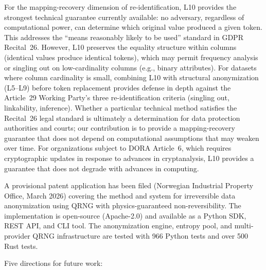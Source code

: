 \documentclass[journal]{IEEEtran}
\begin{document}
For the mapping-recovery dimension of re-identification, L10 provides the strongest technical guarantee currently available: no adversary, regardless of computational power, can determine which original value produced a given token. This addresses the ``means reasonably likely to be used'' standard in GDPR Recital~26. However, L10 preserves the equality structure within columns (identical values produce identical tokens), which may permit frequency analysis or singling out on low-cardinality columns (e.g., binary attributes). For datasets where column cardinality is small, combining L10 with structural anonymization (L5--L9) before token replacement provides defense in depth against the Article~29 Working Party's three re-identification criteria (singling out, linkability, inference). Whether a particular technical method satisfies the Recital~26 legal standard is ultimately a determination for data protection authorities and courts; our contribution is to provide a mapping-recovery guarantee that does not depend on computational assumptions that may weaken over time. For organizations subject to DORA Article~6, which requires cryptographic updates in response to advances in cryptanalysis, L10 provides a guarantee that does not degrade with advances in computing.

A provisional patent application has been filed (Norwegian Industrial Property Office, March 2026) covering the method and system for irreversible data anonymization using QRNG with physics-guaranteed non-reversibility. The implementation is open-source (Apache-2.0) and available as a Python SDK, REST API, and CLI tool. The anonymization engine, entropy pool, and multi-provider QRNG infrastructure are tested with 966 Python tests and over 500 Rust tests.

Five directions for future work:
\end{document}
